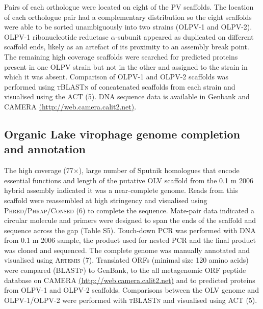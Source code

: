 Pairs of each orthologue were located on eight of the \ac{PV} scaffolds. 
The location of each orthologue pair had a complementary distribution so the eight scaffolds were able to be sorted unambiguously into two strains (\ac{OLPV}-1 and \ac{OLPV}-2). 
\ac{OLPV}-1 ribonucleotide reductase $\alpha$-subunit appeared as duplicated on different scaffold ends, likely as an artefact of its proximity to an assembly break point. 
The remaining high coverage scaffolds were searched for predicted proteins present in one \ac{OLPV} strain but not in the other and assigned to the strain in which it was absent. 
Comparison of \ac{OLPV}-1 and \ac{OLPV}-2 scaffolds was performed using \textsc{tBLASTn} of concatenated scaffolds from each strain and visualised using the \ac{ACT} (5). 
\textsc{DNA} sequence data is available in Genbank and \ac{CAMERA} \url{(http://web.camera.calit2.net)}.

\subsection[Genome completion and annotation]{Organic Lake virophage genome completion and annotation}
The high coverage (77$\times$), large number of Sputnik homologues that encode essential functions and length of the putative \ac{OLV} scaffold from the 0.1 \textmu{}m 2006 hybrid assembly indicated it was a near-complete genome. 
Reads from this scaffold were reassembled at high stringency and visualised using \textsc{Phred/Phrap/Consed} (6) to complete the sequence. 
Mate-pair data indicated a circular molecule and primers were designed to span the ends of the scaffold and sequence across the gap (Table S5). 
Touch-down \ac{PCR} was performed with \textsc{DNA} from 0.1 \textmu{}m 2006 sample, the product used for nested \ac{PCR} and the final product was cloned and sequenced. 
The complete genome was manually annotated and visualised using \textsc{Artemis} (7). 
Translated \acp{ORF} (minimal size 120 amino acids) were compared (\textsc{BLASTp}) to GenBank, to the all metagenomic \ac{ORF} peptide database on \ac{CAMERA} \url{(http://web.camera.calit2.net)} and to predicted proteins from \textsc{OLPV}-1 and \textsc{OLPV}-2 scaffolds. 
Comparisons between the \ac{OLV} genome and \textsc{OLPV}-1/\textsc{OLPV}-2 were performed with \textsc{tBLASTn} and visualised using \ac{ACT} (5). 

